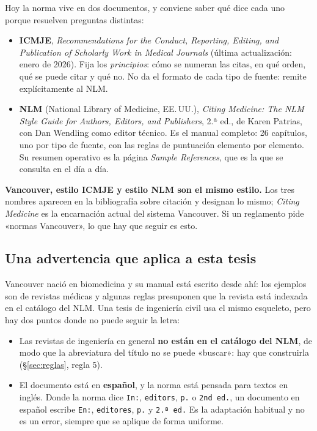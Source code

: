 \documentclass[11pt,a4paper]{article}
\begin{document}
Hoy la norma vive en dos documentos, y conviene saber qué dice cada uno porque resuelven
preguntas distintas:

\begin{itemize}\setlength{\itemsep}{4pt}
\item \textbf{ICMJE}, \emph{Recommendations for the Conduct, Reporting, Editing, and
  Publication of Scholarly Work in Medical Journals} (última actualización: enero de 2026).
  Fija los \emph{principios}: cómo se numeran las citas, en qué orden, qué se puede citar y
  qué no. No da el formato de cada tipo de fuente: remite explícitamente al NLM.
\item \textbf{NLM} (National Library of Medicine, EE.\,UU.), \emph{Citing Medicine: The NLM
  Style Guide for Authors, Editors, and Publishers}, 2.ª ed., de Karen Patrias, con Dan
  Wendling como editor técnico. Es el manual completo: 26 capítulos, uno por tipo de fuente,
  con las reglas de puntuación elemento por elemento. Su resumen operativo es la página
  \emph{Sample References}, que es la que se consulta en el día a día.
\end{itemize}

\begin{nota}
\textbf{Vancouver, estilo ICMJE y estilo NLM son el mismo estilo.} Los tres nombres aparecen
en la bibliografía sobre citación y designan lo mismo; \emph{Citing Medicine} es la
encarnación actual del sistema Vancouver. Si un reglamento pide «normas Vancouver», lo que
hay que seguir es esto.
\end{nota}

\subsection*{Una advertencia que aplica a esta tesis}

Vancouver nació en biomedicina y su manual está escrito desde ahí: los ejemplos son de
revistas médicas y algunas reglas presuponen que la revista está indexada en el catálogo del
NLM. Una tesis de ingeniería civil usa el mismo esqueleto, pero hay dos puntos donde no puede
seguir la letra:

\begin{itemize}
\item Las revistas de ingeniería en general \textbf{no están en el catálogo del NLM}, de modo
  que la abreviatura del título no se puede «buscar»: hay que construirla (§\ref{sec:reglas},
  regla 5).
\item El documento está en \textbf{español}, y la norma está pensada para textos en inglés.
  Donde la norma dice \texttt{In:}, \texttt{editors}, \texttt{p.} o \texttt{2nd ed.}, un
  documento en español escribe \texttt{En:}, \texttt{editores}, \texttt{p.} y \texttt{2.ª
  ed.} Es la adaptación habitual y no es un error, siempre que se aplique de forma uniforme.
\end{itemize}
\end{document}
